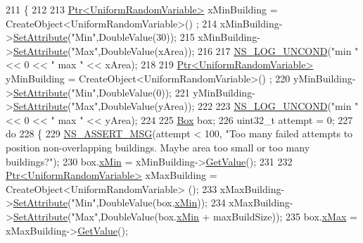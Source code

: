 \begin{DoxyCode}
211 \{
212 
213   \hyperlink{classns3_1_1Ptr}{Ptr<UniformRandomVariable>} xMinBuilding = CreateObject<UniformRandomVariable>()
      ;
214   xMinBuilding->\hyperlink{classns3_1_1ObjectBase_ac60245d3ea4123bbc9b1d391f1f6592f}{SetAttribute}(\textcolor{stringliteral}{"Min"},DoubleValue(30));
215   xMinBuilding->\hyperlink{classns3_1_1ObjectBase_ac60245d3ea4123bbc9b1d391f1f6592f}{SetAttribute}(\textcolor{stringliteral}{"Max"},DoubleValue(xArea));
216 
217   \hyperlink{log-macros-disabled_8h_a0b36e5e182b37194f85ef1c5e979fb2e}{NS\_LOG\_UNCOND}(\textcolor{stringliteral}{"min "} << 0 << \textcolor{stringliteral}{" max "} << xArea);
218 
219   \hyperlink{classns3_1_1Ptr}{Ptr<UniformRandomVariable>} yMinBuilding = CreateObject<UniformRandomVariable>()
      ;
220   yMinBuilding->\hyperlink{classns3_1_1ObjectBase_ac60245d3ea4123bbc9b1d391f1f6592f}{SetAttribute}(\textcolor{stringliteral}{"Min"},DoubleValue(0));
221   yMinBuilding->\hyperlink{classns3_1_1ObjectBase_ac60245d3ea4123bbc9b1d391f1f6592f}{SetAttribute}(\textcolor{stringliteral}{"Max"},DoubleValue(yArea));
222 
223   \hyperlink{log-macros-disabled_8h_a0b36e5e182b37194f85ef1c5e979fb2e}{NS\_LOG\_UNCOND}(\textcolor{stringliteral}{"min "} << 0 << \textcolor{stringliteral}{" max "} << yArea);
224 
225   \hyperlink{classns3_1_1Box}{Box} box;
226   uint32\_t attempt = 0;
227   \textcolor{keywordflow}{do}
228   \{
229     \hyperlink{assert_8h_aff5ece9066c74e681e74999856f08539}{NS\_ASSERT\_MSG}(attempt < 100, \textcolor{stringliteral}{"Too many failed attempts to position non-overlapping
       buildings. Maybe area too small or too many buildings?"});
230     box.\hyperlink{classns3_1_1Box_a1fd6a43d53258323331d34da600ff1c5}{xMin} = xMinBuilding->\hyperlink{classns3_1_1UniformRandomVariable_a03822d8c86ac51e9aa83bbc73041386b}{GetValue}();
231 
232     \hyperlink{classns3_1_1Ptr}{Ptr<UniformRandomVariable>} xMaxBuilding = CreateObject<UniformRandomVariable>
      ();
233     xMaxBuilding->\hyperlink{classns3_1_1ObjectBase_ac60245d3ea4123bbc9b1d391f1f6592f}{SetAttribute}(\textcolor{stringliteral}{"Min"},DoubleValue(box.\hyperlink{classns3_1_1Box_a1fd6a43d53258323331d34da600ff1c5}{xMin}));
234     xMaxBuilding->\hyperlink{classns3_1_1ObjectBase_ac60245d3ea4123bbc9b1d391f1f6592f}{SetAttribute}(\textcolor{stringliteral}{"Max"},DoubleValue(box.\hyperlink{classns3_1_1Box_a1fd6a43d53258323331d34da600ff1c5}{xMin} + maxBuildSize));
235     box.\hyperlink{classns3_1_1Box_a50021049c756e770329145b25d9533a2}{xMax} = xMaxBuilding->\hyperlink{classns3_1_1UniformRandomVariable_a03822d8c86ac51e9aa83bbc73041386b}{GetValue}();

\end{DoxyCode}
